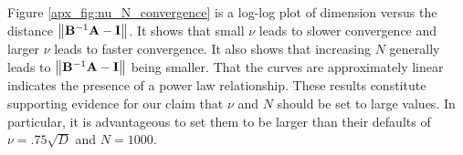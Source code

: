 \documentclass[12pt]{article}  %
\newcommand{\bA}{\mathbf{A}}
\newcommand{\bB}{\mathbf{B}}
\newcommand{\bI}{\mathbf{I}}
\begin{document}
                    Figure \ref{apx_fig:nu_N_convergence} is a log-log plot of dimension versus the distance $\norm{\bB^{-1}\bA - \mathbf{I}}$. It shows that small $\nu$ leads to slower convergence and larger $\nu$ leads to faster convergence. It also shows that increasing $N$ generally leads to $\norm{\bB^{-1}\bA - \bI}$ being smaller. That the curves are approximately linear indicates the presence of a power law relationship. These results constitute supporting evidence for our claim that $\nu$ and $N$ should be set to large values. In particular, it is advantageous to set them to be larger than their defaults of $\nu=.75\sqrt{D}$ and $N=1000$. 
                    

    

    
\end{document}
